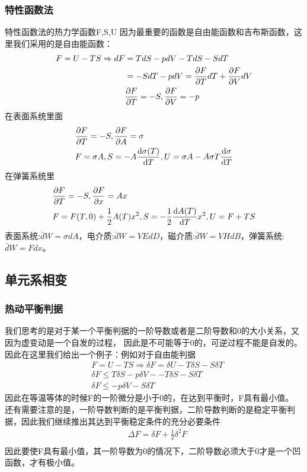 \documentclass[UTF8]{ctexart}
\begin{document}
\subsubsection{特性函数法}
特性函数法的热力学函数F,S,U
因为最重要的函数是自由能函数和吉布斯函数，这里我们采用的是自由能函数：
\begin{align*}
        F=U-TS\Rightarrow dF & =TdS-pdV-TdS-SdT                    \\
                             & =-SdT-pdV=\pdv{F}{T}dT+\pdv{F}{V}dV \\
                             & \pdv{F}{T}=-S,\pdv{F}{V}=-p         \\
\end{align*}
在表面系统里面
\begin{align*}
         & \pdv{F}{T}=-S,\pdv{F}{A}=\sigma                                       \\
         & F=\sigma A,S=-A \dv{\sigma(T)}{T},U=\sigma A -A\sigma T\dv{\sigma}{T}
\end{align*}
在弹簧系统里
\begin{align*}
         & \pdv{F}{T}=-S,\pdv{F}{x}=Ax                                      \\
         & F=F(T,0)+\frac{1}{2}A(T)x^2,S=-\frac{1}{2}\dv{A(T)}{T}x^2,U=F+TS
\end{align*}
表面系统:$\bar{d}W=\sigma dA$，电介质:$\bar{d}W=VEdD$，磁介质:$\bar{d}W=VHdB$，弹簧系统:$\bar{d}W=Fdx$。
\subsection{单元系相变}
\subsubsection{热动平衡判据}
我们思考的是对于某一个平衡判据的一阶导数或者是二阶导数和0的大小关系，又因为虚变动是一个自发的过程，
因此是不可能等于0的，可逆过程不能是自发的。因此在这里我们给出一个例子：例如对于自由能判据
\begin{align*}
         & F=U-TS\Rightarrow \delta F= \delta U -T\delta S-S\delta T \\
         & \delta F \le T\delta S- p\delta V--T\delta S-S\delta T    \\
         & \delta F \leq -p\delta V-S\delta T
\end{align*}
因此在等温等体的时候F的一阶微分是小于0的，在达到平衡时，F具有最小值。
还有需要注意的是，一阶导数判断的是平衡判据，二阶导数判断的是稳定平衡判据，因此我们继续推出其达到平衡稳定条件的充分必要条件
\begin{align*}
         & \Delta F=\delta F+\frac{1}{2}\delta^2 F \\
\end{align*}
因此要使F具有最小值，其一阶导数为0的情况下，二阶导数必须大于0才是一个凹函数，才有极小值。
\end{document}
